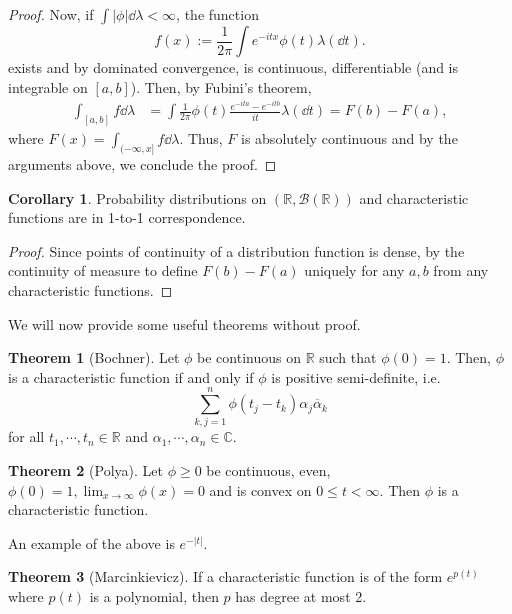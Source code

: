 \documentclass[]{article}
\theoremstyle{definition}
\newtheorem{theorem}{Theorem}
\newtheorem{corollary}{Corollary}[theorem]
\theoremstyle{definition}
\begin{document}
\begin{proof}
  Now, if \(\int |\phi| \dd \lambda < \infty\), the function  
  \[f(x) := \frac{1}{2\pi} \int e^{-itx}\phi(t) \lambda(\dd t).\]
  exists and by dominated convergence, is continuous, differentiable 
  (and is integrable on \([a, b]\)). Then, by Fubini's theorem, 
  \[\begin{split}
    \int_{[a, b]} f \dd \lambda & = 
    \int \frac{1}{2\pi} \phi(t) \frac{e^{-ita} - e^{-itb}}{it} \lambda(\dd t)  
    = F(b) - F(a),
  \end{split}\]
  where \(F(x) = \int_{(-\infty, x]} f \dd \lambda\). Thus, \(F\) is absolutely 
  continuous and by the arguments above, we conclude the proof.
\end{proof}

\begin{corollary}
  Probability distributions on \((\mathbb{R}, \mathcal{B}(\mathbb{R}))\) 
  and characteristic functions are in 1-to-1 correspondence.
\end{corollary}
\begin{proof}
  Since points of continuity of a distribution function is dense, by the 
  continuity of measure to define \(F(b) - F(a)\) uniquely for any \(a, b\) 
  from any characteristic functions.
\end{proof}

We will now provide some useful theorems without proof.

\begin{theorem}[Bochner]
  Let \(\phi\) be continuous on \(\mathbb{R}\) such that \(\phi(0) = 1\). Then, 
  \(\phi\) is a characteristic function if and only if \(\phi\) is positive 
  semi-definite, i.e. 
  \[\sum_{k, j = 1}^n \phi(t_j - t_k) \alpha_j \overline{\alpha}_k\]
  for all \(t_1, \cdots, t_n \in \mathbb{R}\) and 
  \(\alpha_1, \cdots, \alpha_n \in \mathbb{C}\).  
\end{theorem}

\begin{theorem}[Polya]
  Let \(\phi \ge 0\) be continuous, even, \(\phi(0) = 1, \lim_{x \to \infty}\phi(x) = 0\) 
  and is convex on \(0 \le t < \infty\). Then \(\phi\) is a characteristic function.
\end{theorem}

An example of the above is \(e^{-|t|}\).

\begin{theorem}[Marcinkievicz]
  If a characteristic function is of the form \(e^{p(t)}\) where \(p(t)\) is a 
  polynomial, then \(p\) has degree at most 2. 
\end{theorem}
\end{document}
